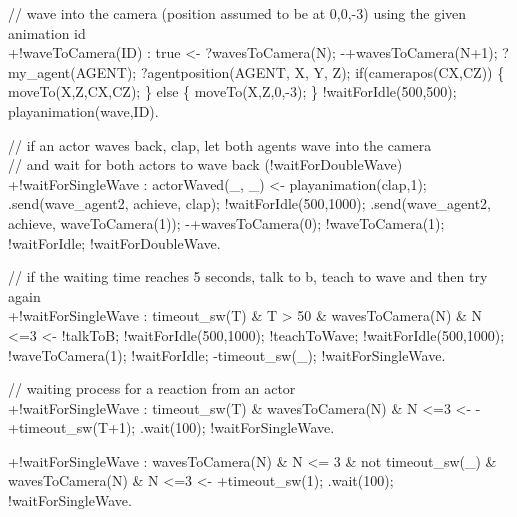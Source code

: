 \documentclass[draft,final]{vutinfth} %
\begin{document}
{// wave into the camera (position assumed to be at 0,0,-3) using the given animation id\\
+!waveToCamera(ID) : true
                    <-  ?wavesToCamera(N);
                        -+wavesToCamera(N+1);
                        ?my\_agent(AGENT);
                        ?agentposition(AGENT, X, Y, Z);
                        if(camerapos(CX,CZ))
                        \{
                           moveTo(X,Z,CX,CZ); 
                        \}
                        else
                        \{
                            moveTo(X,Z,0,-3); 
                        \}
                        !waitForIdle(500,500);
                        playanimation(wave,ID).


// if an actor waves back, clap, let both agents wave into the camera \\
// and wait for both actors to wave back (!waitForDoubleWave) \\
+!waitForSingleWave : actorWaved(\_, \_)
                    <-  playanimation(clap,1);
                        .send(wave\_agent2, achieve, clap);
                        !waitForIdle(500,1000);
                        .send(wave\_agent2, achieve, waveToCamera(1));
                        -+wavesToCamera(0);
                        !waveToCamera(1);
                        !waitForIdle;
                        !waitForDoubleWave.

// if the waiting time reaches 5 seconds, talk to b, teach to wave and then try again \\
+!waitForSingleWave : timeout\_sw(T) \& T > 50 \& wavesToCamera(N) \& N <=3
                    <-  !talkToB;
                        !waitForIdle(500,1000);
                        !teachToWave;
                        !waitForIdle(500,1000);
                        !waveToCamera(1);
                        !waitForIdle;
                        -timeout\_sw(\_);
                        !waitForSingleWave.

// waiting process for a reaction from an actor \\
+!waitForSingleWave : timeout\_sw(T) \& wavesToCamera(N) \& N <=3
                    <-  -+timeout\_sw(T+1);
                        .wait(100);
                        !waitForSingleWave.

+!waitForSingleWave : wavesToCamera(N) \& N <= 3 \& not timeout\_sw(\_) \& wavesToCamera(N) \& N <=3
                    <-  +timeout\_sw(1);
                        .wait(100);
                        !waitForSingleWave.

}
\end{document}
